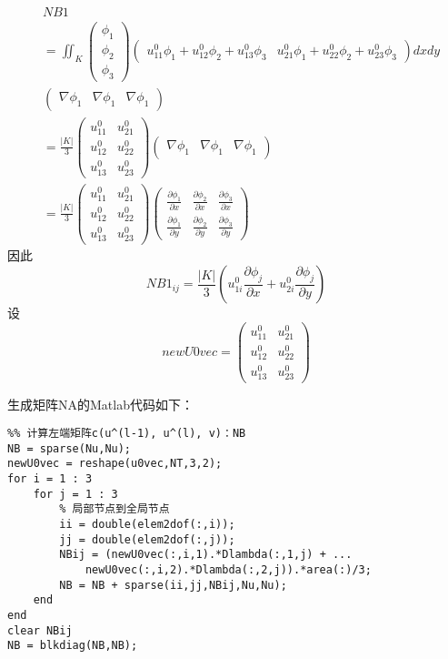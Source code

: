 \documentclass{ctexart}
\begin{document}
\begin{align*}
    & NB1 \\
    & = \iint_K 
    \begin{pmatrix}
     \phi_1\\
     \phi_2\\
    \phi_3
    \end{pmatrix}
    \begin{pmatrix}
     u_{11}^0 \phi_1 + u_{12}^0 \phi_2  + u_{13}^0 \phi_3 
    & u_{21}^0 \phi_1 + u_{22}^0 \phi_2  + u_{23}^0 \phi_3 
    \end{pmatrix}dxdy\\
    & \begin{pmatrix}
     \nabla \phi_1 & \nabla \phi_1 & \nabla \phi_1
    \end{pmatrix} \\
    & = \frac{|K|}{3}\begin{pmatrix}
      u_{11}^0& u_{21}^0 \\
    u_{12}^0& u_{22}^0 \\
     u_{13}^0& u_{23}^0 
    \end{pmatrix} 
    \begin{pmatrix}
     \nabla \phi_1 & \nabla \phi_1 & \nabla \phi_1
    \end{pmatrix}\\
    &  = \frac{|K|}{3}\begin{pmatrix}
        u_{11}^0& u_{21}^0 \\
      u_{12}^0& u_{22}^0 \\
       u_{13}^0& u_{23}^0 
      \end{pmatrix} 
      \begin{pmatrix}
       \frac{\partial \phi_1}{\partial x} & \frac{\partial \phi_2}{\partial x}  & 
       \frac{\partial \phi_3}{\partial x}  \\
       \frac{\partial \phi_1}{\partial y} & \frac{\partial \phi_2}{\partial y}  & 
       \frac{\partial \phi_3}{\partial y} 
      \end{pmatrix}
\end{align*}
因此
$$
NB1_{ij} = \frac{|K|}{3}(u_{1i}^0 \frac{\partial \phi_j}{\partial x}+u_{2i}^0 \frac{\partial \phi_j}{\partial y}) 
$$
设
$$
newU0vec = 
\begin{pmatrix}
    u_{11}^0& u_{21}^0 \\
    u_{12}^0& u_{22}^0 \\
     u_{13}^0& u_{23}^0
\end{pmatrix}
$$

生成矩阵NA的Matlab代码如下：
\begin{lstlisting}
%% 计算左端矩阵c(u^(l-1), u^(l), v)：NB
NB = sparse(Nu,Nu);
newU0vec = reshape(u0vec,NT,3,2);
for i = 1 : 3
    for j = 1 : 3
        % 局部节点到全局节点
        ii = double(elem2dof(:,i));
        jj = double(elem2dof(:,j));
        NBij = (newU0vec(:,i,1).*Dlambda(:,1,j) + ...
            newU0vec(:,i,2).*Dlambda(:,2,j)).*area(:)/3;
        NB = NB + sparse(ii,jj,NBij,Nu,Nu);
    end
end
clear NBij
NB = blkdiag(NB,NB);
\end{lstlisting}
\end{document}
